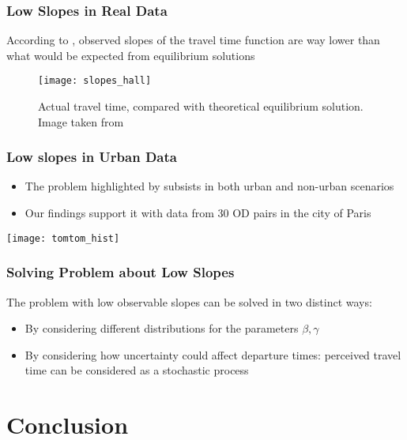 \documentclass[hyperref={pdfpagelabels=false}]{beamer}
\begin{document}
\begin{frame}
  \frametitle{Low Slopes in Real Data}
  According to \textcite{https://doi.org/10.1111/iere.12692},
  observed slopes of the travel time function are way lower than what would be expected from equilibrium solutions
  \begin{figure}
    \centering
    \texttt{[image: slopes\_hall]}
    \caption{Actual travel time, compared with theoretical equilibrium solution. Image taken from \textcite{https://doi.org/10.1111/iere.12692}}
  \end{figure}
\end{frame}

\begin{frame}
  \frametitle{Low slopes in Urban Data}
  \begin{itemize}
  \item The problem highlighted by \textcite{https://doi.org/10.1111/iere.12692} subsists in both urban and non-urban scenarios
  \item Our findings support it with data from 30 OD pairs in the city of Paris
  \end{itemize}
  \centering
  \texttt{[image: tomtom\_hist]}
\end{frame}

\begin{frame}
  \frametitle{Solving Problem about Low Slopes }
  The problem with low observable slopes can be solved in two distinct ways:
  \begin{itemize}
  \item<2-> By considering different distributions for the parameters \(\beta, \gamma\)
  \item<3-> By considering how uncertainty could affect departure times:
    perceived travel time can be considered as a stochastic process
  \end{itemize}
\end{frame}

\section{Conclusion}

\begin{frame}
  \tableofcontents[currentsection]
\end{frame}
\end{document}
